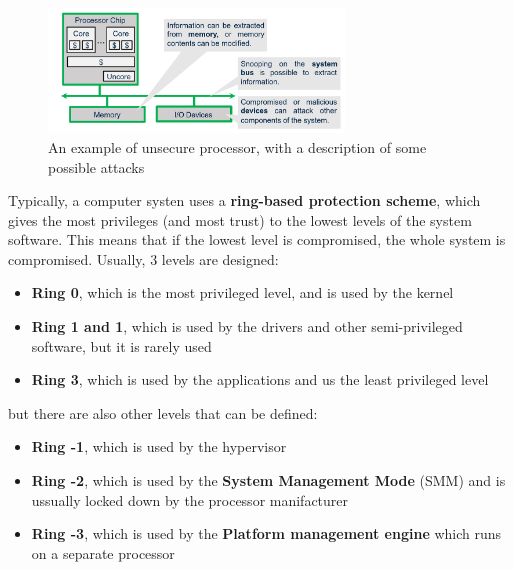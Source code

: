 \begin{figure}[H]
  \centering
  \includegraphics[width=0.7\textwidth]{img/hardware/unsecure processor.png}
  \caption{An example of unsecure processor, with a description of some possible attacks}
\end{figure}

Typically, a computer systen uses a \textbf{ring-based protection scheme}, which gives the most
privileges (and most trust) to the lowest levels of the system software. This means that if the 
lowest level is compromised, the whole system is compromised. Usually, 3 levels are designed:
\begin{itemize}
  \item \textbf{Ring 0}, which is the most privileged level, and is used by the kernel
  \item \textbf{Ring 1 and 1}, which is used by the drivers and other semi-privileged software, but
    it is rarely used
  \item \textbf{Ring 3}, which is used by the applications and us the least privileged level
\end{itemize}
but there are also other levels that can be defined:
\begin{itemize}
  \item \textbf{Ring -1}, which is used by the hypervisor
  \item \textbf{Ring -2}, which is used by the \textbf{System Management Mode} (SMM) and is ussually
    locked down by the processor manifacturer
  \item \textbf{Ring -3}, which is used by the \textbf{Platform management engine} which runs on a
    separate processor
\end{itemize}

